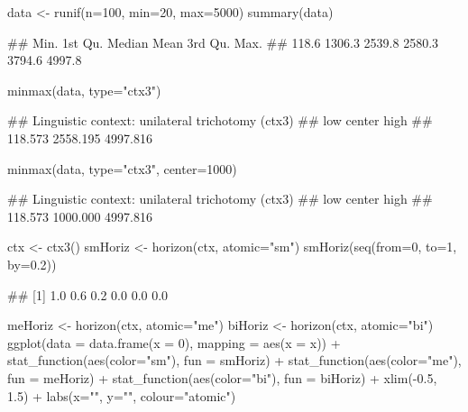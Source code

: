 \documentclass{article}\usepackage[]{graphicx}\usepackage[]{color}
\begin{document}
\begin{Schunk}
% --begin: "minmax"
\begin{Sinput}
data <- runif(n=100, min=20, max=5000)
summary(data)
\end{Sinput}
\begin{Soutput}
##    Min. 1st Qu.  Median    Mean 3rd Qu.    Max. 
##   118.6  1306.3  2539.8  2580.3  3794.6  4997.8
\end{Soutput}
\begin{Sinput}
minmax(data, type="ctx3")
\end{Sinput}
\begin{Soutput}
## Linguistic context: unilateral trichotomy (ctx3)
##      low   center     high 
##  118.573 2558.195 4997.816
\end{Soutput}
%
% --end: "minmax"
\end{Schunk}

\begin{Schunk}
% --begin: "minmax2"
\begin{Sinput}
minmax(data, type="ctx3", center=1000)
\end{Sinput}
\begin{Soutput}
## Linguistic context: unilateral trichotomy (ctx3)
##      low   center     high 
##  118.573 1000.000 4997.816
\end{Soutput}
%
% --end: "minmax2"
\end{Schunk}

\begin{Schunk}
% --begin: "horizon"
\begin{Sinput}
ctx <- ctx3()
smHoriz <- horizon(ctx, atomic="sm")
smHoriz(seq(from=0, to=1, by=0.2))
\end{Sinput}
\begin{Soutput}
## [1] 1.0 0.6 0.2 0.0 0.0 0.0
\end{Soutput}
%
% --end: "horizon"
\end{Schunk}

\begin{Schunk}
\begin{Sinput}
meHoriz <- horizon(ctx, atomic="me")
biHoriz <- horizon(ctx, atomic="bi")
ggplot(data = data.frame(x = 0), mapping = aes(x = x)) +
  stat_function(aes(color="sm"), fun = smHoriz) +
  stat_function(aes(color="me"), fun = meHoriz) +
  stat_function(aes(color="bi"), fun = biHoriz) +
  xlim(-0.5, 1.5) +
  labs(x="", y="", colour="atomic\nexpression")
\end{Sinput}
\end{Schunk}
\end{document}
